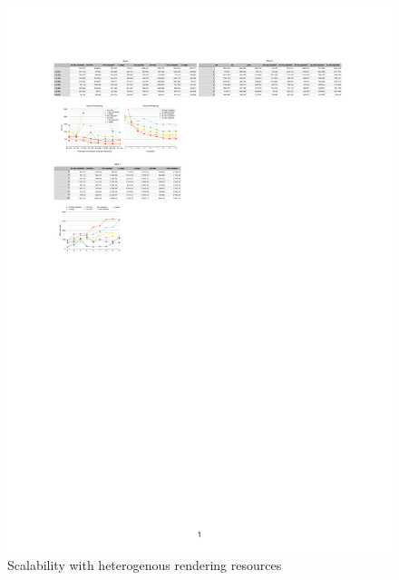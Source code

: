 \documentclass[10pt,journal,compsoc]{IEEEtran}
\begin{document}
\begin{figure}[ht]\center
  \includegraphics[width=\textwidth]{images/equalizers}
  \caption{\label{fEqualizers}Scalability with heterogenous rendering resources}
\end{figure}
\end{document}
